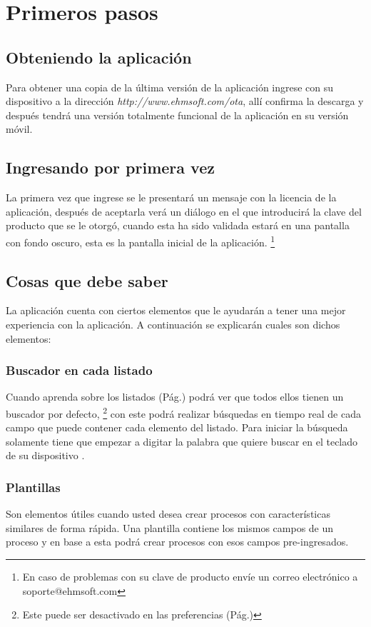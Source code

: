 \chapter{Primeros pasos}
\setcounter{page}{4}

\section{Obteniendo la aplicaci\'on}
Para obtener una copia de la \'ultima versi\'on de la aplicaci\'on ingrese con
su dispositivo \blackberry a la direcci\'on \emph{http://www.ehmsoft.com/ota},
all\'i confirma la descarga y despu\'es tendr\'a una versi\'on
totalmente funcional de la aplicaci\'on en su versi\'on m\'ovil.
\section{Ingresando por primera vez}
La primera vez que ingrese se le presentar\'a un mensaje con la licencia de la
aplicaci\'on, despu\'es de aceptarla ver\'a un di\'alogo en el que
introducir\'a la clave del producto que se le otorg\'o, cuando esta ha sido
validada estar\'a en una pantalla con fondo oscuro, esta es la pantalla inicial
de la aplicaci\'on.
\footnote{En caso de problemas con su clave de producto env\'ie un correo
electr\'onico a \mbox{soporte@ehmsoft.com}}


\section{Cosas que debe saber}
La aplicaci\'on cuenta con ciertos elementos que le ayudar\'an a tener una
mejor experiencia con la aplicaci\'on. A continuaci\'on se explicar\'an cuales
son dichos elementos:

\subsection{Buscador en cada listado}
Cuando aprenda sobre los listados
(P\'ag.\pageref{sec:consultandoLaInformacion}) podr\'a ver que todos ellos tienen
un buscador por defecto,
\footnote{Este puede ser desactivado en las preferencias
(P\'ag.\pageref{sec:busquedaPantallas})}
 con este podr\'a realizar b\'usquedas en tiempo real de cada campo que puede
contener cada elemento del listado. Para iniciar la b\'usqueda solamente tiene
que empezar a digitar la palabra que quiere buscar en el teclado de su
dispositivo \blackberry.
\subsection{Plantillas}
Son elementos \'utiles cuando usted desea crear procesos con
caracter\'isticas similares de forma r\'apida. Una plantilla contiene los mismos
campos de un proceso y en base a esta podr\'a crear procesos con esos campos
pre-ingresados.
